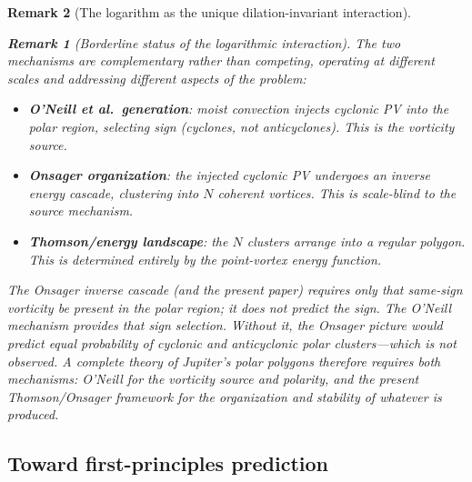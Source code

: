 \documentclass[12pt, a4paper]{article}
\newtheorem{remark}{Remark}[section]
\numberwithin{equation}{section}
\begin{document}
\begin{remark}[The logarithm as the unique dilation-invariant interaction]
\begin{remark}[Borderline status of the logarithmic interaction]
The two mechanisms are complementary rather than competing, operating
at different scales and addressing different aspects of the problem:
\begin{itemize}
\item \textbf{O'Neill et al.\ generation}: moist convection injects
  cyclonic PV into the polar region, selecting \emph{sign} (cyclones,
  not anticyclones).  This is the vorticity \emph{source}.
\item \textbf{Onsager organization}: the injected cyclonic PV undergoes
  an inverse energy cascade, clustering into $N$ coherent vortices.
  This is scale-blind to the source mechanism.
\item \textbf{Thomson/energy landscape}: the $N$ clusters arrange into
  a regular polygon.  This is determined entirely by the point-vortex
  energy function.
\end{itemize}
The Onsager inverse cascade (and the present paper) requires only that
same-sign vorticity be present in the polar region; it does not predict
the sign.  The O'Neill mechanism provides that sign selection.  Without
it, the Onsager picture would predict equal probability of cyclonic and
anticyclonic polar clusters---which is not observed.  A complete theory
of Jupiter's polar polygons therefore requires both mechanisms:
O'Neill for the vorticity source and polarity, and the present
Thomson/Onsager framework for the organization and stability of
whatever is produced.

\subsection{Toward first-principles prediction}
\label{sec:first-principles}


\end{remark}
\end{remark}
\end{document}
